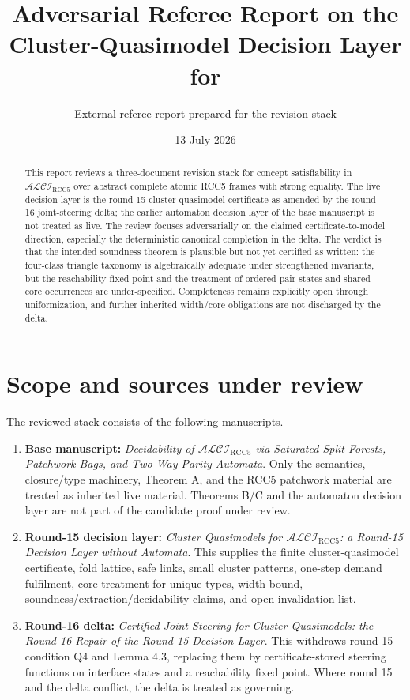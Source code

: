 \documentclass[11pt]{article}
\title{Adversarial Referee Report on the Cluster-Quasimodel Decision Layer for \ALCIRCC}
\author{External referee report prepared for the revision stack}
\date{13 July 2026}
\newcommand{\ALCIRCC}{\ensuremath{\mathcal{ALCI}_{\mathrm{RCC5}}}}
\begin{document}
\maketitle

\begin{abstract}
This report reviews a three-document revision stack for concept satisfiability in \ALCIRCC{} over abstract complete atomic RCC5 frames with strong equality.  The live decision layer is the round-15 cluster-quasimodel certificate as amended by the round-16 joint-steering delta; the earlier automaton decision layer of the base manuscript is not treated as live.  The review focuses adversarially on the claimed certificate-to-model direction, especially the deterministic canonical completion in the delta.  The verdict is that the intended soundness theorem is plausible but not yet certified as written: the four-class triangle taxonomy is algebraically adequate under strengthened invariants, but the reachability fixed point and the treatment of ordered pair states and shared core occurrences are under-specified.  Completeness remains explicitly open through uniformization, and further inherited width/core obligations are not discharged by the delta.
\end{abstract}

\tableofcontents

\section{Scope and sources under review}

The reviewed stack consists of the following manuscripts.
\begin{enumerate}[label=(\arabic*)]
  \item \textbf{Base manuscript:} \emph{Decidability of \ALCIRCC{} via Saturated Split Forests, Patchwork Bags, and Two-Way Parity Automata}.  Only the semantics, closure/type machinery, Theorem A, and the RCC5 patchwork material are treated as inherited live material.  Theorems B/C and the automaton decision layer are not part of the candidate proof under review.
  \item \textbf{Round-15 decision layer:} \emph{Cluster Quasimodels for \ALCIRCC{}: a Round-15 Decision Layer without Automata}.  This supplies the finite cluster-quasimodel certificate, fold lattice, safe links, small cluster patterns, one-step demand fulfilment, core treatment for unique types, width bound, soundness/extraction/decidability claims, and open invalidation list.
  \item \textbf{Round-16 delta:} \emph{Certified Joint Steering for Cluster Quasimodels: the Round-16 Repair of the Round-15 Decision Layer}.  This withdraws round-15 condition Q4 and Lemma 4.3, replacing them by certificate-stored steering functions on interface states and a reachability fixed point.  Where round 15 and the delta conflict, the delta is treated as governing.
\end{enumerate}
\end{document}
